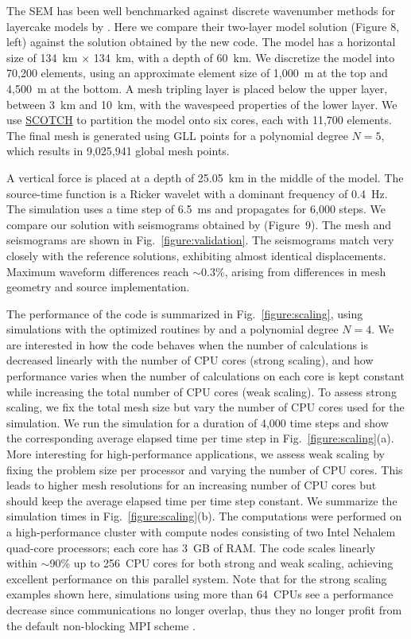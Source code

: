 \documentclass[referee,extra]{gji}
\renewcommand{\cite}[1]{\citet{#1}}
\begin{document}
The SEM has been well benchmarked against discrete wavenumber methods
for layercake models by \cite{KoTr99}.
Here we compare their two-layer model solution (Figure 8, left) against the solution obtained by the new code.
The model has a horizontal size of 134~km $\times$ 134~km,
with a depth of 60~km.
We discretize the model into 70,200 elements,
using an approximate element size of 1,000~m at the top and 4,500~m at the bottom.
A mesh tripling layer is placed below the upper layer, between 3~km and 10~km,
with the wavespeed properties of the lower layer.
We use \href{http://www.labri.fr/perso/pelegrin/scotch/}{SCOTCH} to partition the model onto six cores, each with 11,700 elements.
The final mesh is generated using GLL points for a polynomial degree $N = 5$,
which results in 9,025,941 global mesh points.

A vertical force is placed at a depth of 25.05~km in the middle of the model.
The source-time function is a Ricker wavelet with a dominant frequency of 0.4~Hz.
The simulation uses a time step of 6.5~ms and propagates for 6,000 steps.
We compare our solution with seismograms obtained by \cite{KoTr99} (Figure~9).
The mesh and seismograms are shown in Fig.~\ref{figure:validation}.
The seismograms match very closely with the reference solutions,
exhibiting almost identical displacements.
Maximum waveform differences reach $\sim$0.3\%, arising from differences in mesh geometry and source implementation.

The performance of the code is summarized in Fig.~\ref{figure:scaling},
using simulations with the optimized routines by
\cite{DeFiMu02} and a polynomial degree $N = 4$.
We are interested in how the code behaves when the number of calculations is decreased linearly with the number of CPU cores (strong scaling),
and how performance varies when the number of calculations on each core is kept constant while increasing the total number of CPU cores (weak scaling).
To assess strong scaling, we fix the total mesh size but vary the number of CPU cores used for the simulation.
We run the simulation for a duration of 4,000 time steps and show the corresponding average elapsed time
per time step in Fig.~\ref{figure:scaling}(a).
More interesting for high-performance applications, we assess weak scaling
by fixing the problem size per processor and varying the number of CPU cores.
This leads to higher mesh resolutions for an increasing number of CPU cores but should keep the average elapsed time
per time step constant.
We summarize the simulation times in Fig.~\ref{figure:scaling}(b).
The computations were performed on a high-performance cluster with compute nodes consisting of two
Intel Nehalem quad-core processors; each core has 3~GB of RAM.
The code scales linearly within $\sim$90\% up to 256~CPU cores for both strong and weak scaling,
achieving excellent performance on this parallel system.
Note that for the strong scaling examples shown here,
simulations using more than 64~CPUs see a performance decrease since
communications  no longer overlap, thus
they no longer profit from the default non-blocking MPI scheme \citep{MaKoBlLe08}.
\end{document}
